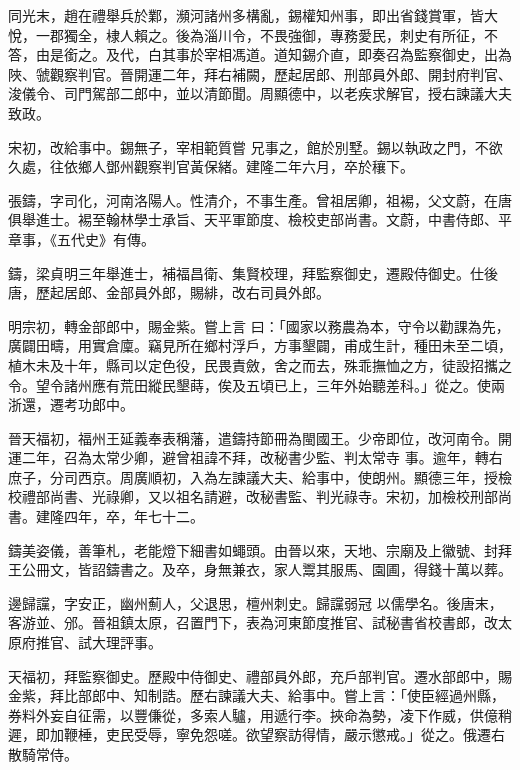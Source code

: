 \begin{pinyinscope}
 同光末，趙在禮舉兵於鄴，瀕河諸州多構亂，錫權知州事，即出省錢賞軍，皆大悅，一郡獨全，棣人賴之。後為淄川令，不畏強御，專務愛民，刺史有所征，不答，由是銜之。及代，白其事於宰相馮道。道知錫介直，即奏召為監察御史，出為陜、虢觀察判官。晉開運二年，拜右補闕，歷起居郎、刑部員外郎、開封府判官、浚儀令、司門駕部二郎中，並以清節聞。周顯德中，以老疾求解官，授右諫議大夫致政。



 宋初，改給事中。錫無子，宰相範質嘗
 兄事之，館於別墅。錫以執政之門，不欲久處，往依鄉人鄧州觀察判官黃保緒。建隆二年六月，卒於穰下。



 張鑄，字司化，河南洛陽人。性清介，不事生產。曾祖居卿，祖裼，父文蔚，在唐俱舉進士。裼至翰林學士承旨、天平軍節度、檢校吏部尚書。文蔚，中書侍郎、平章事，《五代史》有傳。



 鑄，梁貞明三年舉進士，補福昌衛、集賢校理，拜監察御史，遷殿侍御史。仕後唐，歷起居郎、金部員外郎，賜緋，改右司員外郎。



 明宗初，轉金部郎中，賜金紫。嘗上言
 曰：「國家以務農為本，守令以勸課為先，廣闢田疇，用實倉廩。竊見所在鄉村浮戶，方事墾闢，甫成生計，種田未至二頃，植木未及十年，縣司以定色役，民畏責斂，舍之而去，殊乖撫恤之方，徒設招攜之令。望令諸州應有荒田縱民墾蒔，俟及五頃已上，三年外始聽差科。」從之。使兩浙還，遷考功郎中。



 晉天福初，福州王延義奉表稱藩，遣鑄持節冊為閩國王。少帝即位，改河南令。開運二年，召為太常少卿，避曾祖諱不拜，改秘書少監、判太常寺
 事。逾年，轉右庶子，分司西京。周廣順初，入為左諫議大夫、給事中，使朗州。顯德三年，授檢校禮部尚書、光祿卿，又以祖名請避，改秘書監、判光祿寺。宋初，加檢校刑部尚書。建隆四年，卒，年七十二。



 鑄美姿儀，善筆札，老能燈下細書如蠅頭。由晉以來，天地、宗廟及上徽號、封拜王公冊文，皆詔鑄書之。及卒，身無兼衣，家人鬻其服馬、園圃，得錢十萬以葬。



 邊歸讜，字安正，幽州薊人，父退思，檀州刺史。歸讜弱冠
 以儒學名。後唐末，客游並、邠。晉祖鎮太原，召置門下，表為河東節度推官、試秘書省校書郎，改太原府推官、試大理評事。



 天福初，拜監察御史。歷殿中侍御史、禮部員外郎，充戶部判官。遷水部郎中，賜金紫，拜比部郎中、知制誥。歷右諫議大夫、給事中。嘗上言：「使臣經過州縣，券料外妄自征需，以豐傔從，多索人驢，用遞行李。挾命為勢，凌下作威，供億稍遲，即加鞭棰，吏民受辱，寧免怨嗟。欲望察訪得情，嚴示懲戒。」從之。俄遷右散騎常侍。




\end{pinyinscope}
